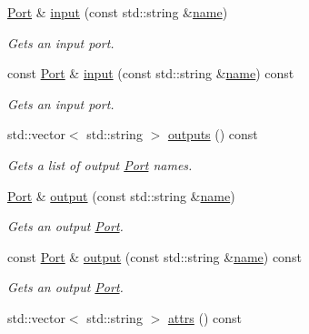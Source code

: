 \begin{DoxyCompactItemize}
\hyperlink{classdg_1_1deepcore_1_1_port}{Port} \& \hyperlink{classdg_1_1deepcore_1_1_node_ab989e614ca802698356be8a5d46faa49}{input} (const std\+::string \&\hyperlink{classdg_1_1deepcore_1_1_named_object_ab1379a28467dd39a81ceb02cf50dedde}{name})
\begin{DoxyCompactList}\small\item\em Gets an input port. \end{DoxyCompactList}\item 
const \hyperlink{classdg_1_1deepcore_1_1_port}{Port} \& \hyperlink{classdg_1_1deepcore_1_1_node_aebf7bc1bcfe21ff03e7d92a6037daa37}{input} (const std\+::string \&\hyperlink{classdg_1_1deepcore_1_1_named_object_ab1379a28467dd39a81ceb02cf50dedde}{name}) const 
\begin{DoxyCompactList}\small\item\em Gets an input port. \end{DoxyCompactList}\item 
std\+::vector$<$ std\+::string $>$ \hyperlink{classdg_1_1deepcore_1_1_node_a81cc04114467cd4724c05dfa3d1e975c}{outputs} () const 
\begin{DoxyCompactList}\small\item\em Gets a list of output \hyperlink{classdg_1_1deepcore_1_1_port}{Port} names. \end{DoxyCompactList}\item 
\hyperlink{classdg_1_1deepcore_1_1_port}{Port} \& \hyperlink{classdg_1_1deepcore_1_1_node_a2f88c5f894f2151877525cf305129a8f}{output} (const std\+::string \&\hyperlink{classdg_1_1deepcore_1_1_named_object_ab1379a28467dd39a81ceb02cf50dedde}{name})
\begin{DoxyCompactList}\small\item\em Gets an output \hyperlink{classdg_1_1deepcore_1_1_port}{Port}. \end{DoxyCompactList}\item 
const \hyperlink{classdg_1_1deepcore_1_1_port}{Port} \& \hyperlink{classdg_1_1deepcore_1_1_node_acaca8e2a5b497d0de8ca538bffc0eb32}{output} (const std\+::string \&\hyperlink{classdg_1_1deepcore_1_1_named_object_ab1379a28467dd39a81ceb02cf50dedde}{name}) const 
\begin{DoxyCompactList}\small\item\em Gets an output \hyperlink{classdg_1_1deepcore_1_1_port}{Port}. \end{DoxyCompactList}\item 
std\+::vector$<$ std\+::string $>$ \hyperlink{classdg_1_1deepcore_1_1_node_acbf1083b3a00898cbd5170ac730e5777}{attrs} () const 

\end{DoxyCompactItemize}
